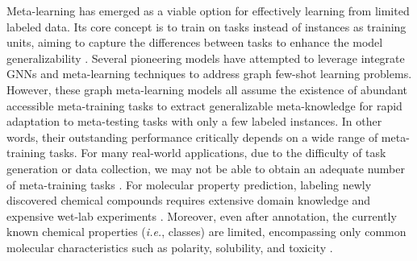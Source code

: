 Meta-learning has emerged as a viable option for effectively learning from limited labeled data. %
Its core concept is to train on tasks instead of instances as training units, aiming to capture the differences between tasks to enhance the model generalizability \cite{hospedales2021meta}. Several pioneering models \cite{zhou2019meta, wang2022task} have attempted to leverage integrate GNNs and meta-learning techniques to address graph few-shot learning problems. %
However, these graph meta-learning models all assume the existence of abundant accessible meta-training tasks to extract generalizable meta-knowledge for rapid adaptation to meta-testing tasks with only a few labeled instances. In other words, their outstanding performance critically depends on a wide range of meta-training tasks. %
For many real-world applications, due to the difficulty of task generation or data collection, we may not be able to obtain an adequate number of meta-training tasks \cite{tan2022transductive, yao2021meta, lee2022set}. For molecular property prediction, %
labeling newly discovered chemical compounds requires extensive domain knowledge and expensive wet-lab experiments \cite{Guo21few}. Moreover, even after annotation, the currently known chemical properties (\textit{i.e.}, classes) are limited, encompassing only common molecular characteristics such as polarity, solubility, and toxicity \cite{livingstone2000characterization}. %

